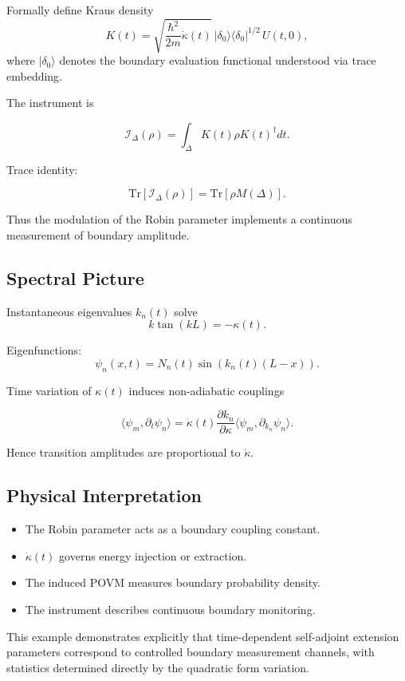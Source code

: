 \documentclass[11pt,a4paper]{article}
\begin{document}
Formally define Kraus density
\[
K(t)
=
\sqrt{\frac{\hbar^2}{2m}\dot\kappa(t)}\,
|\delta_0\rangle\!\langle \delta_0|^{1/2}
\, U(t,0),
\]
where $|\delta_0\rangle$ denotes the boundary evaluation functional
understood via trace embedding.

The instrument is

\[
\mathcal I_\Delta(\rho)
=
\int_\Delta
K(t)\rho K(t)^\dagger dt.
\]

Trace identity:

\[
\mathrm{Tr}[\mathcal I_\Delta(\rho)]
=
\mathrm{Tr}[\rho M(\Delta)].
\]

Thus the modulation of the Robin parameter implements
a continuous measurement of boundary amplitude.

\subsection{Spectral Picture}

Instantaneous eigenvalues $k_n(t)$ solve
\[
k \tan(kL) = -\kappa(t).
\]

Eigenfunctions:
\[
\psi_n(x,t)
=
N_n(t)
\sin(k_n(t)(L-x)).
\]

Time variation of $\kappa(t)$ induces non-adiabatic couplings

\[
\langle \psi_m, \partial_t \psi_n \rangle
=
\dot\kappa(t)
\frac{\partial k_n}{\partial \kappa}
\langle \psi_m, \partial_{k_n}\psi_n \rangle.
\]

Hence transition amplitudes are proportional to $\dot\kappa$.

\subsection{Physical Interpretation}

\begin{itemize}
\item The Robin parameter acts as a boundary coupling constant.
\item $\dot\kappa(t)$ governs energy injection or extraction.
\item The induced POVM measures boundary probability density.
\item The instrument describes continuous boundary monitoring.
\end{itemize}

\medskip

This example demonstrates explicitly that time-dependent self-adjoint
extension parameters correspond to controlled boundary measurement
channels, with statistics determined directly by the quadratic form
variation.
\end{document}
